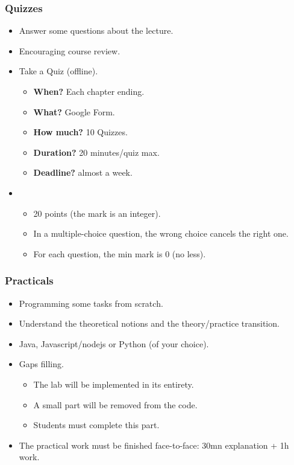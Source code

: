 \documentclass{beamer}
\begin{document}
\begin{frame}
	\frametitle{Quizzes}
	
	\begin{itemize}
		\item Answer some questions about the lecture.
		\item {} Encouraging course review.
		\item {} Take a Quiz (offline).
		\begin{itemize}
			\item \textbf{When?} Each chapter ending.
			\item \textbf{What?} Google Form.
			\item \textbf{How much?} 10 Quizzes.
			\item \textbf{Duration?} 20 minutes/quiz max.
			\item \textbf{Deadline?} almost a week.
		\end{itemize}
		\item {}
		\begin{itemize}
			\item 20 points (the mark is an integer).
			\item In a multiple-choice question, the wrong choice cancels the right one.
			\item For each question, the min mark is 0 (no less).
		\end{itemize}
	\end{itemize}
	
\end{frame}

\begin{frame}
	\frametitle{Practicals}
	
	\begin{itemize}
		\item Programming some tasks from scratch.
		\item {} Understand the theoretical notions and the theory/practice transition.
		\item {} Java, Javascript/nodejs or Python (of your choice).
		\item {} Gaps filling.
		\begin{itemize}
			\item The lab will be implemented in its entirety.
			\item A small part will be removed from the code.
			\item Students must complete this part.
		\end{itemize}
		\item The practical work must be finished face-to-face: 30mn explanation + 1h work.
	\end{itemize}
	
\end{frame}
\end{document}
